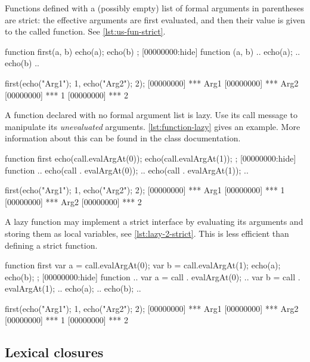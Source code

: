 Functions defined with a (possibly empty) list of formal arguments in
parentheses are strict: the effective arguments are first evaluated,
and then their value is given to the called function.  See
\autoref{lst:us-fun-strict}.

\begin{urbiscript}[caption=Strict Functions,
  label=lst:us-fun-strict,float=\floatpos]
function first(a, b) {
  echo(a); echo(b)
};
[00000000:hide] function (a, b) {
..  echo(a);
..  echo(b)
..}

first({echo("Arg1"); 1},
      {echo("Arg2"); 2});
[00000000] *** Arg1
[00000000] *** Arg2
[00000000] *** 1
[00000000] *** 2
\end{urbiscript}

A function declared with no formal argument list is lazy.  Use its
call message to manipulate its \emph{unevaluated} arguments.
\autoref{lst:function-lazy} gives an example.  More information about
this can be found in the  class documentation.

\begin{urbiscript}[caption=Lazy function,label=lst:function-lazy]
function first
{
  echo(call.evalArgAt(0));
  echo(call.evalArgAt(1));
};
[00000000:hide] function {
..  echo(call . evalArgAt(0));
..  echo(call . evalArgAt(1));
..}

first({echo("Arg1"); 1},
      {echo("Arg2"); 2});
[00000000] *** Arg1
[00000000] *** 1
[00000000] *** Arg2
[00000000] *** 2
\end{urbiscript}

A lazy function may implement a strict interface by evaluating its
arguments and storing them as local variables, see
\autoref{lst:lazy-2-strict}.  This is less efficient than defining a
strict function.

\begin{urbiscript}[caption=Lazy functions with strict semantics,
  label=lst:lazy-2-strict]
function first
{
  var a = call.evalArgAt(0);
  var b = call.evalArgAt(1);
  echo(a); echo(b);
};
[00000000:hide] function {
..  var a = call . evalArgAt(0);
..  var b = call . evalArgAt(1);
..  echo(a);
..  echo(b);
..}

first({echo("Arg1"); 1},
      {echo("Arg2"); 2});
[00000000] *** Arg1
[00000000] *** Arg2
[00000000] *** 1
[00000000] *** 2
\end{urbiscript}

\subsection{Lexical closures}
\label{sec:us-fun-closures}

